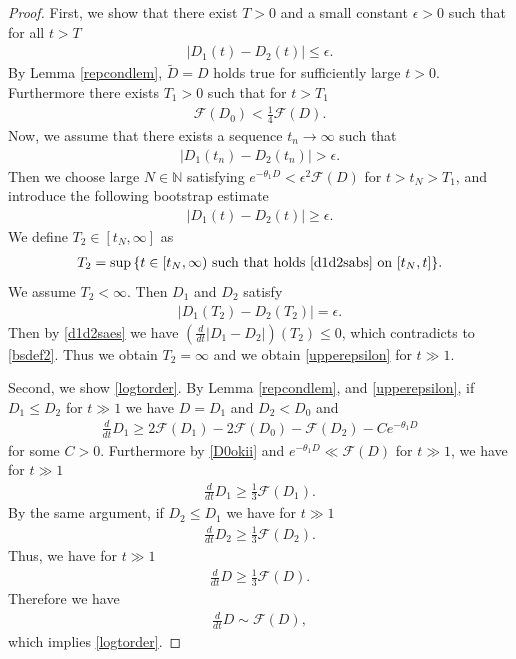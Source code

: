 \documentclass[10pt,a4paper]{amsart}
\begin{document}
\begin{proof}
First, we show that there exist $T>0$ and a small constant $\epsilon>0$ such that for all $t>T$
\begin{align}\label{upperepsilon}
|D_1(t)-D_2(t)|\leq \epsilon.
\end{align}
By Lemma \ref{repcondlem}, $\tilde{D}=D$ holds true for sufficiently large $t>0$. Furthermore there exists $T_1>0$ such that for $t>T_1$
\begin{align}\label{D0okii}
\mathcal{F}(D_0)<\frac{1}{4}\mathcal{F}(D).
\end{align}
Now, we assume that there exists a sequence $t_n\to\infty$ such that 
\begin{align*}
|D_1(t_n)-D_2(t_n)|>\epsilon.
\end{align*}
Then we choose large $N\in \mathbb{N}$ satisfying $e^{-\theta_1 D}<\epsilon^2\mathcal{F}(D)$ for $t>t_N>T_1$, and introduce the following bootstrap estimate
\begin{align}\label{d1d2sabs}
|D_1(t)-D_2(t)|\geq \epsilon.
\end{align}
We define $T_2\in [t_N,\infty]$ as 
\begin{align}\label{bsdef2}
T_2=\sup{\{ t\in[t_N, \infty)\ \mbox{such that holds}\ \eqref{d1d2sabs}\ \mbox{on}\ [t_N,t] \}} .
\end{align}
We assume $T_2<\infty$. Then $D_1$ and $D_2$ satisfy
\begin{align*}
|D_1(T_2)-D_2(T_2)|=\epsilon.
\end{align*}
Then by \eqref{d1d2saes} we have $\left(\frac{d}{dt}|D_1-D_2|\right)(T_2)\leq  0$, which contradicts to \eqref{bsdef2}. Thus we obtain $T_2=\infty$ and we obtain \eqref{upperepsilon} for $t\gg 1$.

Second, we show \eqref{logtorder}. By Lemma \ref{repcondlem}, and \eqref{upperepsilon}, if $D_1\leq D_2$ for $t\gg 1$ we have $D=D_1$ and $D_2<D_0$ and 
\begin{align*}
\frac{d}{dt}D_1\geq 2\mathcal{F}(D_1)-2\mathcal{F}(D_0)-\mathcal{F}(D_2)-Ce^{-\theta_1 D}
\end{align*}
for some $C>0$. Furthermore by \eqref{D0okii} and $e^{-\theta_1 D}\ll \mathcal{F}(D)$ for $t\gg1$, we have for $t\gg 1$
\begin{align*}
\frac{d}{dt}D_1\geq \frac{1}{3}\mathcal{F}(D_1).
\end{align*}
By the same argument, if $D_2\leq D_1$ we have for $t\gg 1$
\begin{align*}
\frac{d}{dt}D_2\geq \frac{1}{3}\mathcal{F}(D_2).
\end{align*}
Thus, we have for $t\gg 1$
\begin{align*}
\frac{d}{dt}D\geq \frac{1}{3}\mathcal{F}(D).
\end{align*}
Therefore we have 
\begin{align*}
\frac{d}{dt}D\sim \mathcal{F}(D),
\end{align*}
which implies \eqref{logtorder}.


\end{proof}
\end{document}
